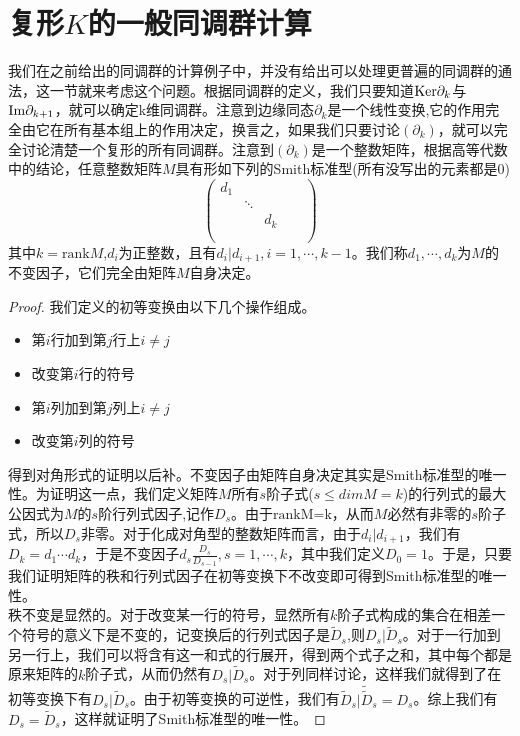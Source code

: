 \section{复形$K$的一般同调群计算}
我们在之前给出的同调群的计算例子中，并没有给出可以处理更普遍的同调群的通法，这一节就来考虑这个问题。根据同调群的定义，我们只要知道${\rm Ker}\partial_{k}$与${\rm Im}\partial_{k+1}$，就可以确定k维同调群。注意到边缘同态$\partial_{k}$是一个线性变换,它的作用完全由它在所有基本组上的作用决定，换言之，如果我们只要讨论$(\partial_{k})$，就可以完全讨论清楚一个复形的所有同调群。注意到$(\partial_{k})$是一个整数矩阵，根据高等代数中的结论，任意整数矩阵$M$具有形如下列的Smith标准型(所有没写出的元素都是0)
\begin{equation*}
  \left(\begin{array}{ccccc}
     d_{1}& & & & \\
     & \ddots& & &  \\
      & &d_{k} & &  \\
       & & & &  \\
     \end{array} \right) 
\end{equation*}
其中$k=\text{rank}M$,$d_{i}$为正整数，且有$d_{i}|d_{i+1},i=1,\cdots,k-1$。我们称$d_{1},\cdots,d_{k}$为$M$的不变因子，它们完全由矩阵$M$自身决定。
\begin{proof}
我们定义的初等变换由以下几个操作组成。
\begin{itemize}
    \item 第$i$行加到第$j$行上$i\neq j$\\
    \item 改变第$i$行的符号\\
    \item 第$i$列加到第$j$列上$i\neq j$\\
     \item 改变第$i$列的符号\\
\end{itemize}
得到对角形式的证明以后补。不变因子由矩阵自身决定其实是Smith标准型的唯一性。为证明这一点，我们定义矩阵$M$所有$s$阶子式($s\leq dimM=k $)的行列式的最大公因式为$M$的$s$阶行列式因子,记作$D_{s}$。由于$\text{rankM=k}$，从而$M$必然有非零的$s$阶子式，所以$D_{s}$非零。对于化成对角型的整数矩阵而言，由于$d_{i}|d_{i+1}$，我们有$D_{k}=d_{1}\cdots d_{k}$，于是不变因子$d_{s}\frac{D_{s}}{D_{s-1}},s=1,\cdots,k$，其中我们定义$D_{0}=1$。于是，只要我们证明矩阵的秩和行列式因子在初等变换下不改变即可得到Smith标准型的唯一性。\\
秩不变是显然的。对于改变某一行的符号，显然所有$k$阶子式构成的集合在相差一个符号的意义下是不变的，记变换后的行列式因子是$\widetilde{D}_{s}$,则$D_{s}|\widetilde{D}_{s}$。对于一行加到另一行上，我们可以将含有这一和式的行展开，得到两个式子之和，其中每个都是原来矩阵的$k$阶子式，从而仍然有$D_{s}|\widetilde{D}_{s}$。对于列同样讨论，这样我们就得到了在初等变换下有$D_{s}|\widetilde{D}_{s}$。由于初等变换的可逆性，我们有$\widetilde{D}_{s}|\widetilde{\widetilde{D}}_{s}=D_{s}$。综上我们有$D_{s}=\widetilde{D}_{s}$，这样就证明了Smith标准型的唯一性。
\end{proof}
